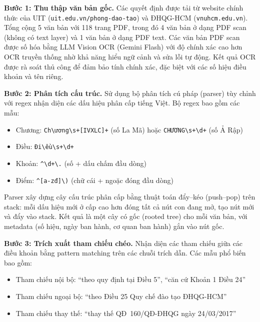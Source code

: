 \textbf{Bước 1: Thu thập văn bản gốc.}
Các quyết định được tải từ website chính thức của UIT
(\texttt{uit.edu.vn/phong-dao-tao}) và ĐHQG-HCM (\texttt{vnuhcm.edu.vn}). Tổng
cộng 5 văn bản với 118 trang PDF, trong đó 4 văn bản ở dạng PDF scan (không có text
layer) và 1 văn bản ở dạng PDF text. Các văn bản PDF scan được số hóa bằng LLM
Vision OCR (Gemini Flash) với độ chính xác cao hơn OCR truyền thống nhờ khả năng
hiểu ngữ cảnh và sửa lỗi tự động. Kết quả OCR được rà soát thủ công để đảm
bảo tính chính xác, đặc biệt với các số hiệu điều khoản và tên riêng.

\textbf{Bước 2: Phân tích cấu trúc.}
Sử dụng bộ phân tích cú pháp (parser) tùy chỉnh với regex nhận diện các dấu hiệu
phân cấp tiếng Việt. Bộ regex bao gồm các mẫu:

\begin{itemize}
  \item Chương: \texttt{Ch\textbackslash ương\textbackslash s+[IVXLC]+} (số La Mã)
        hoặc \texttt{CHƯƠNG\textbackslash s+\textbackslash d+} (số Ả Rập)
  \item Điều: \texttt{Đi\textbackslash ều\textbackslash s+\textbackslash d+}
  \item Khoản: \texttt{\textasciicircum\textbackslash d+\textbackslash .} (số + dấu chấm đầu
        dòng)
  \item Điểm: \texttt{\textasciicircum[a-zđ]\textbackslash )} (chữ cái + ngoặc đóng đầu dòng)
\end{itemize}

Parser xây dựng cây cấu trúc phân cấp bằng thuật toán đẩy--kéo (push--pop) trên
stack: mỗi dấu hiệu mới ở cấp cao hơn đóng tất cả nút con đang mở, tạo nút mới
và đẩy vào stack. Kết quả là một cây có gốc (rooted tree) cho mỗi văn bản, với
metadata (số hiệu, ngày ban hành, cơ quan ban hành) gắn vào nút gốc.

\textbf{Bước 3: Trích xuất tham chiếu chéo.}
Nhận diện các tham chiếu giữa các điều khoản bằng pattern matching trên các chuỗi
trích dẫn. Các mẫu phổ biến bao gồm:

\begin{itemize}
  \item Tham chiếu nội bộ: ``theo quy định tại Điều 5'', ``căn cứ Khoản 1 Điều 24''
  \item Tham chiếu ngoại bộ: ``theo Điều 25 Quy chế đào tạo ĐHQG-HCM''
  \item Tham chiếu thay thế: ``thay thế QĐ~160/QĐ-ĐHQG ngày 24/03/2017''
\end{itemize}


